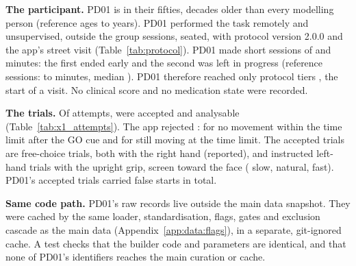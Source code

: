 \textbf{The participant.}
PD01 is in their fifties, decades older than every modelling person (reference ages  to  years).
PD01 performed the task remotely and unsupervised, outside the group sessions, seated, with protocol version 2.0.0 and the app's street visit (Table~\ref{tab:protocol}).
PD01 made  short sessions of  and  minutes: the first ended early and the second was left in progress (reference sessions:  to  minutes, median ).
PD01 therefore reached only protocol tiers , the start of a visit.
No clinical score and no medication state were recorded.

\textbf{The trials.}
Of  attempts,  were accepted and analysable (Table~\ref{tab:x1_attempts}).
The app rejected :  for no movement within the time limit after the GO cue and  for still moving at the time limit.
The accepted trials are  free-choice trials, both with the right hand (reported), and  instructed left-hand trials with the upright grip, screen toward the face ( slow,  natural,  fast).
PD01's accepted trials carried  false starts in total.


\textbf{Same code path.}
PD01's raw records live outside the main data snapshot.
They were cached by the same loader, standardisation, flags, gates and exclusion cascade as the main data (Appendix~\ref{app:data:flags}), in a separate, git-ignored cache.
A test checks that the builder code and parameters are identical, and that none of PD01's identifiers reaches the main curation or cache.

